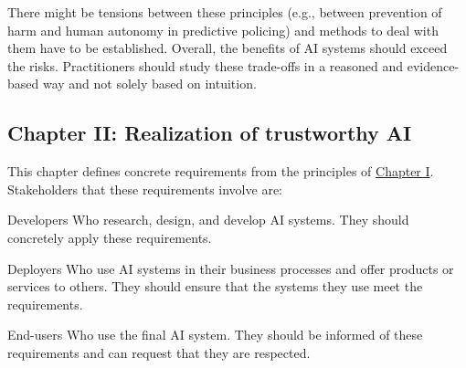 \begin{remark}
    There might be tensions between these principles (e.g., between prevention of harm and human autonomy in predictive policing) and methods to deal with them have to be established. Overall, the benefits of AI systems should exceed the risks. Practitioners should study these trade-offs in a reasoned and evidence-based way and not solely based on intuition. 
\end{remark}


\subsection{Chapter II: Realization of trustworthy AI} \label{sec:hleg_ch2}

This chapter defines concrete requirements from the principles of \hyperref[sec:hleg_ch1]{Chapter I}. Stakeholders that these requirements involve are:
\begin{descriptionlist}
    \item[Developers] 
        Who research, design, and develop AI systems. They should concretely apply these requirements.

    \item[Deployers] 
        Who use AI systems in their business processes and offer products or services to others. They should ensure that the systems they use meet the requirements.

    \item[End-users] 
        Who use the final AI system. They should be informed of these requirements and can request that they are respected.
\end{descriptionlist}

